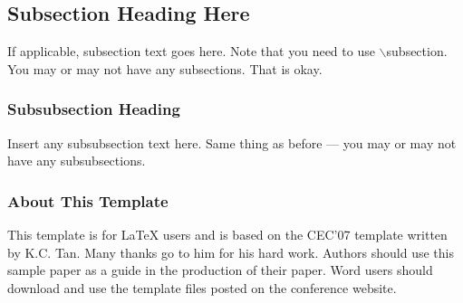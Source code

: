 \documentclass[conference]{IEEEtran}
\begin{document}
\subsection{Subsection Heading Here}
If applicable, subsection text goes here.  Note that you need to use
$\backslash$subsection.  You may or may not have any subsections.
That is okay.

\subsubsection{Subsubsection Heading}
Insert any subsubsection text here.  Same thing as before --- you may
or may not have any subsubsections.

\subsubsection{About This Template}
This template is for LaTeX users and is based on the CEC'07 template
written by K.C. Tan.  Many thanks go to him for his hard work.  Authors
should use this sample paper as a guide in the production of their paper.
Word users should download and use the template files posted on the
conference website.
\end{document}
